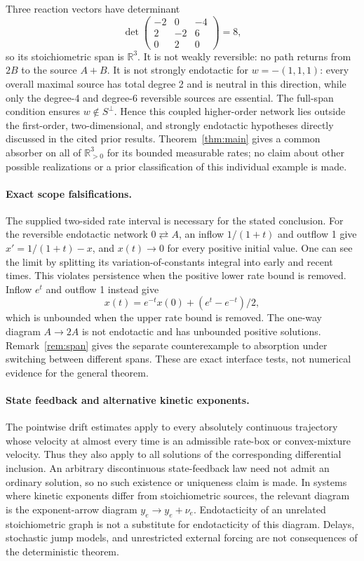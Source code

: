 \documentclass[11pt]{article}
\theoremstyle{definition}
\theoremstyle{remark}
\newcommand{\R}{\mathbb R}
\numberwithin{equation}{section}
\begin{document}
Three reaction vectors have determinant
\[
 \det\begin{pmatrix}
 -2&0&-4\\2&-2&6\\0&2&0
 \end{pmatrix}=8,
\]
so its stoichiometric span is $\R^3$. It is not weakly
reversible: no path returns from $2B$ to the source $A+B$.
It is not strongly endotactic for $w=-(1,1,1)$: every
overall maximal source has total degree 2 and is neutral
in this direction, while only the degree-4 and degree-6
reversible sources are essential. The full-span condition
ensures $w\notin S^\perp$. Hence this coupled higher-order
network lies outside the first-order, two-dimensional,
and strongly endotactic hypotheses directly discussed in
the cited prior results. Theorem~\ref{thm:main} gives a
common absorber on all of $\R_{>0}^3$ for its bounded
measurable rates; no claim about other possible realizations
or a prior classification of this individual example is made.

\paragraph{Exact scope falsifications.}
The supplied two-sided rate interval is necessary for the
stated conclusion. For the reversible endotactic network
$0\rightleftarrows A$, an inflow $1/(1+t)$ and outflow 1
give $x'=1/(1+t)-x$, and $x(t)\to0$ for every positive
initial value. One can see the limit by splitting its
variation-of-constants integral into early and recent
times. This violates persistence when the positive lower
rate bound is removed. Inflow $e^t$ and outflow 1 instead
give
\[
 x(t)=e^{-t}x(0)+(e^t-e^{-t})/2,
\]
which is unbounded when the upper rate bound is removed.
The one-way diagram $A\to2A$ is not endotactic and has
unbounded positive solutions. Remark~\ref{rem:span} gives
the separate counterexample to absorption under switching
between different spans. These are exact interface tests,
not numerical evidence for the general theorem.

\paragraph{State feedback and alternative kinetic exponents.}
The pointwise drift estimates apply to every absolutely
continuous trajectory whose velocity at almost every time is an
admissible rate-box or convex-mixture velocity. Thus they
also apply to all solutions of the corresponding differential
inclusion. An arbitrary discontinuous state-feedback law
need not admit an ordinary solution, so no such existence
or uniqueness claim is made. In systems where kinetic
exponents differ from stoichiometric sources, the relevant
diagram is the exponent-arrow diagram
$y_e\to y_e+\nu_e$. Endotacticity of an unrelated
stoichiometric graph is not a substitute for endotacticity
of this diagram. Delays, stochastic jump models, and
unrestricted external forcing are not consequences of the
deterministic theorem.
\end{document}
